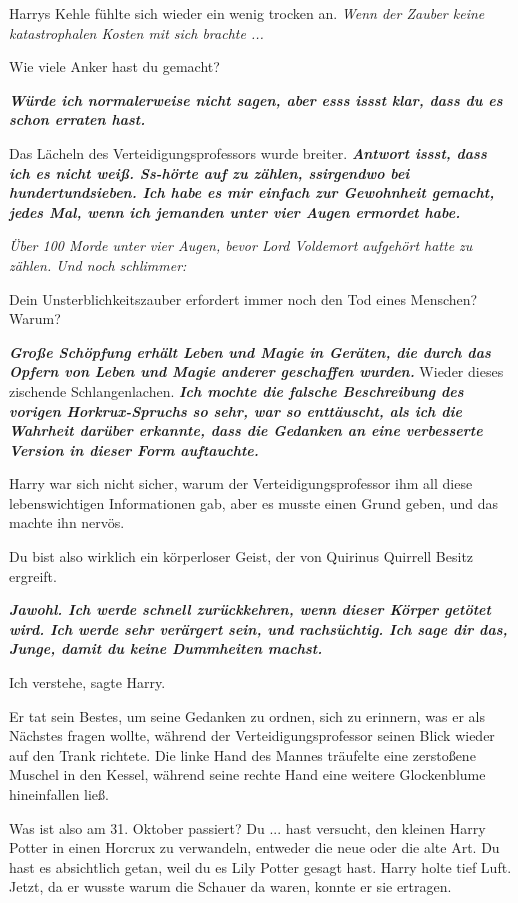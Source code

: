 Harrys Kehle fühlte sich wieder ein wenig trocken an.
\emph{Wenn der Zauber keine katastrophalen Kosten mit sich brachte ...}

\glqq{}Wie viele Anker hast du gemacht?\grqq{}

\glqq{}\textbf{\emph{Würde ich normalerweise nicht sagen, aber esss issst klar,
dass du es schon erraten hast.}}\grqq{}

Das Lächeln des Verteidigungsprofessors wurde breiter. \glqq{}
\textbf{\emph{Antwort issst, dass ich es nicht weiß. Ss-hörte auf zu zählen,
ssirgendwo bei hundertundsieben. Ich habe es mir einfach zur Gewohnheit gemacht,
jedes Mal, wenn ich jemanden unter vier Augen ermordet habe.}}\grqq{}

\emph{Über 100 Morde unter vier Augen, bevor Lord Voldemort aufgehört hatte zu
zählen. Und noch schlimmer:}

\glqq{}Dein Unsterblichkeitszauber erfordert immer noch den Tod eines Menschen?
Warum?\grqq{}

\glqq{}\textbf{\emph{Große Schöpfung erhält Leben und Magie in Geräten, die durch
das Opfern von Leben und Magie anderer geschaffen wurden.}}\grqq{} Wieder dieses
zischende Schlangenlachen. \glqq{}\textbf{\emph{Ich mochte die falsche
Beschreibung des vorigen Horkrux-Spruchs so sehr, war so enttäuscht, als ich die
Wahrheit darüber erkannte, dass die Gedanken an eine verbesserte Version in
dieser Form auftauchte.}}\grqq{}

Harry war sich nicht sicher, warum der Verteidigungsprofessor ihm all diese
lebenswichtigen Informationen gab, aber es musste einen Grund geben, und das
machte ihn nervös.

\glqq{}Du bist also wirklich ein körperloser Geist, der von Quirinus Quirrell
Besitz ergreift.\grqq{}

\glqq{}\textbf{\emph{Jawohl. Ich werde schnell zurückkehren, wenn dieser Körper
getötet wird. Ich werde sehr verärgert sein, und rachsüchtig. Ich sage dir das,
Junge, damit du keine Dummheiten machst.}}\grqq{}

\glqq{}Ich verstehe\grqq{}, sagte Harry.

Er tat sein Bestes, um seine Gedanken zu ordnen, sich zu erinnern, was er als
Nächstes fragen wollte, während der Verteidigungsprofessor seinen Blick wieder
auf den Trank richtete. Die linke Hand des Mannes träufelte eine zerstoßene
Muschel in den Kessel, während seine rechte Hand eine weitere Glockenblume
hineinfallen ließ.

\glqq{}Was ist also am 31. Oktober passiert? Du ... hast versucht, den kleinen
Harry Potter in einen Horcrux zu verwandeln, entweder die neue oder die alte
Art. Du hast es absichtlich getan, weil du es Lily Potter gesagt hast.\grqq{}
Harry holte tief Luft. Jetzt, da er wusste warum die Schauer da waren, konnte er
sie ertragen.

